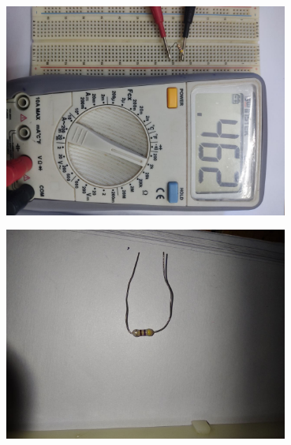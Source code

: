 \documentclass[12pt]{article}
\begin{document}
\begin{minipage}{0.45\textwidth}
    \centering
    \includegraphics[angle=90, width=0.7\textwidth]{Res1.1.jpg}
\end{minipage}\hspace{30pt}
\begin{minipage}{0.45\textwidth}
    \centering
    \includegraphics[angle=90, width=0.7\textwidth]{Res1.2.jpg}
\end{minipage}
\end{document}
